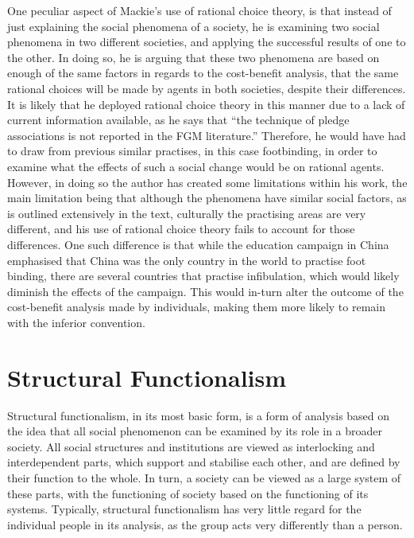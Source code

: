 \documentclass[twoside, 11pt]{article}
\begin{document}
	One peculiar aspect of Mackie's use of rational choice theory, is that instead of just explaining the social phenomena of a society, he is examining two social phenomena in two different societies, and applying the successful results of one to the other. In doing so, he is arguing that these two phenomena are based on enough of the same factors in regards to the cost-benefit analysis, that the same rational choices will be made by agents in both societies, despite their differences. It is likely that he deployed rational choice theory in this manner due to a lack of current information available, as he says that ``the technique of pledge associations is not reported in the FGM literature.'' \cite[p.1016]{Mackie1996} Therefore, he would have had to draw from previous similar practises, in this case footbinding, in order to examine what the effects of such a social change would be on rational agents. However, in doing so the author has created some limitations within his work, the main limitation being that although the phenomena have similar social factors, as is outlined extensively in the text, culturally the practising areas are very different, and his use of rational choice theory fails to account for those differences. One such difference is that while the education campaign in China emphasised that China was the only country in the world to practise foot binding, \cite[p.1010]{Mackie1996} there are several countries that practise infibulation, which would likely diminish the effects of the campaign. This would in-turn alter the outcome of the cost-benefit analysis made by individuals, making them more likely to remain with the inferior convention.

\section*{Structural Functionalism}
	Structural functionalism, in its most basic form, is a form of analysis based on the idea that all social phenomenon can be examined by its role in a broader society. All social structures and institutions are viewed as interlocking and interdependent parts, which support and stabilise each other, and are defined by their function to the whole. In turn, a society can be viewed as a large system of these parts, with the functioning of society based on the functioning of its systems. Typically, structural functionalism has very little regard for the individual people in its analysis, as the group acts very differently than a person. 
\end{document}
